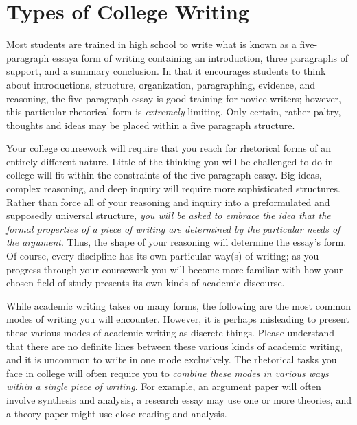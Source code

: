 

\chapter{Types of College Writing}

Most students are trained in high school to write what is known as a
five-paragraph essay\textemdash a form of writing containing an introduction,
three paragraphs of support, and a summary conclusion. In that it encourages
students to think about introductions, structure, organization, paragraphing,
evidence, and reasoning, the five-paragraph essay is good training for novice
writers; however, this particular rhetorical form is \emph{extremely} limiting.
Only certain, rather paltry, thoughts and ideas may be placed within a five
paragraph structure. 

Your college coursework will require that you reach for rhetorical forms of an
entirely different nature. Little of the thinking you will be challenged to do
in college will fit within the constraints of the five-paragraph essay. Big
ideas, complex reasoning, and deep inquiry will require more sophisticated structures.
Rather than force all of your reasoning and inquiry into a preformulated and
supposedly universal structure, \emph{you will be asked to embrace the idea that
the formal properties of a piece of writing are determined by the particular needs of the
argument}. Thus, the shape of your reasoning will determine the essay's form. Of
course, every discipline has its own particular way(s) of writing; as you
progress through your coursework you will become more familiar with how your
chosen field of study presents its own kinds of academic discourse.

While academic writing takes on many forms, the following are the most common
modes of writing you will encounter. However, it is perhaps misleading to
present these various modes of academic writing as discrete things. Please
understand that there are no definite lines between these various kinds of academic
writing, and it is uncommon to write in one mode exclusively. The rhetorical tasks
you face in college will often require you to \emph{combine these modes in
various ways within a single piece of writing}. For example, an argument paper
will often involve synthesis and analysis, a research essay may use one or more
theories, and a theory paper might use close reading and analysis.

